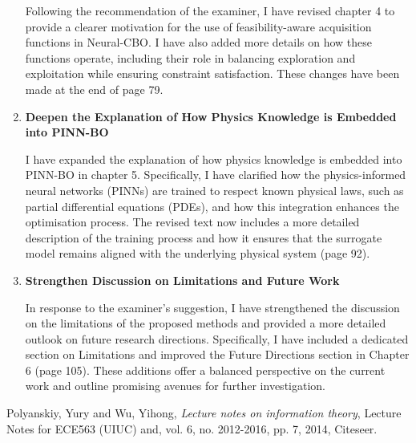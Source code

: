 \documentclass[12pt]{article}
\begin{document}
\begin{enumerate}[leftmargin=0pt, label={\textbf{\arabic*.}}, itemsep=2em]
Following the recommendation of the examiner, I have revised chapter 4 to provide a clearer motivation for the use of feasibility-aware acquisition functions in Neural-CBO. I have also added more details on how these functions operate, including their role in balancing exploration and exploitation while ensuring constraint satisfaction. These changes have been made at the end of page 79.
\item \textbf{Deepen the Explanation of How Physics Knowledge is Embedded into PINN-BO}

I have expanded the explanation of how physics knowledge is embedded into PINN-BO in chapter 5. Specifically, I have clarified how the physics-informed neural networks (PINNs) are trained to respect known physical laws, such as partial differential equations (PDEs), and how this integration enhances the optimisation process. The revised text now includes a more detailed description of the training process and how it ensures that the surrogate model remains aligned with the underlying physical system (page 92). 
\item \textbf{Strengthen Discussion on Limitations and Future Work}

In response to the examiner's suggestion, I have strengthened the discussion on the limitations of the proposed methods and provided a more detailed outlook on future research directions. Specifically, I have included a dedicated section on Limitations and improved the Future Directions section in Chapter 6 (page 105). These additions offer a balanced perspective on the current work and outline promising avenues for further investigation.

\end{enumerate}
\begin{thebibliography}{9}
Polyanskiy, Yury and Wu, Yihong,
\textit{Lecture notes on information theory},
Lecture Notes for ECE563 (UIUC) and, vol. 6, no. 2012-2016, pp. 7, 2014, Citeseer.
\end{thebibliography}
\end{document}
